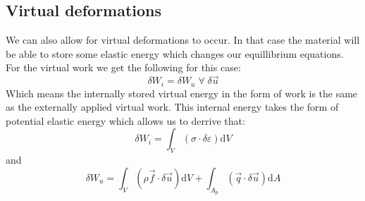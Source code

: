 \documentclass[11pt, a4paper]{article}
\renewcommand*{\epsilon}{\varepsilon}
\renewcommand*{\d}{\text{d}}
\numberwithin{equation}{section}
\numberwithin{figure}{section}
\begin{document}
\subsection{Virtual deformations}
We can also allow for virtual deformations to occur. In that case the material will be able to store some elastic energy which changes our equillibrium equations. For the virtual work we get the following for this case:
\begin{equation*}
  \delta W_i = \delta W_u\;\forall\;\delta\vec{u}
\end{equation*}
Which means the internally stored virtual energy in the form of work is the same as the externally applied virtual work. This internal energy takes the form of potential elastic energy which allows us to derrive that:
\begin{equation*}
  \delta W_i = \int_V (\sigma \cdot \delta\epsilon)\d V
\end{equation*}
and
\begin{equation*}
  \delta W_u = \int_V \left( \rho \vec{f} \cdot \delta\vec{u}\right)\d V + \int_{A_p} \left( \vec{q} \cdot \delta\vec{u} \right)\d A
\end{equation*}
\end{document}
